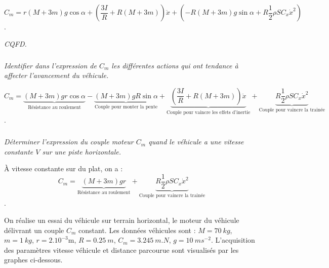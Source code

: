 \documentclass[10pt,fleqn]{article} %
\begin{document}
\begin{multicols}{2}
\begin{corrige}
$C_m=r\left(M+3m\right)g \cos \alpha+\left(\dfrac{3I}{R}+R\left(M+3m\right)\right)\ddot{x} +\left(-R\left(M+3m\right)g\sin \alpha+ R\dfrac{1}{2}\rho S C_x \dot{x}^2\right)$. 

\begin{flushright}
\textit{CQFD.}
\end{flushright}

\end{corrige}
\else
\fi

\subparagraph{}
\textit{Identifier dans l’expression de $C_m$ les différentes actions qui ont tendance à affecter l’avancement du véhicule. }
\ifprof
\begin{corrige}

$$C_m=\underbrace{\left(M+3m\right)gr \cos \alpha}_{\text{Résistance au roulement}}-\underbrace{\left(M+3m\right)gR\sin \alpha}_{\text{Couple pour monter la pente}}+\underbrace{\left(\dfrac{3I}{R}+R\left(M+3m\right)\right)\ddot{x}}_{\text{Couple pour vaincre les effets d'inertie}} + \underbrace{R\dfrac{1}{2}\rho S C_x \dot{x}^2}_{\text{Couple pour vaincre la trainée}}$$. 

\end{corrige}
\else
\fi


\subparagraph{}
\textit{Déterminer l’expression du couple moteur $C_m$ quand le véhicule a une vitesse constante $V$ sur une piste horizontale. }
\ifprof
\begin{corrige}
À vitesse constante sur du plat, on a :
$$C_m=\underbrace{\left(M+3m\right)gr}_{\text{Résistance au roulement}} + \underbrace{R\dfrac{1}{2}\rho S C_x \dot{x}^2}_{\text{Couple pour vaincre la trainée}}$$. 
\end{corrige}
\else
\fi

\ifprof
\else
On réalise un essai du véhicule sur terrain horizontal, le moteur du véhicule délivrant un couple $C_m$ constant.   
Les données véhicules sont :  $M = \SI{70}{kg}$, $m = \SI{1}{kg}$, $r = {2.10^{-3}}\text{m}$, $R = \SI{0,25}{m}$, $C_m= \SI{3,245}{m.N}$, $g = \SI{10}{ms^{-2}}$. L’acquisition des paramètres vitesse véhicule et distance parcourue sont visualisés par les graphes ci-dessous. 



\end{multicols}
\end{document}
